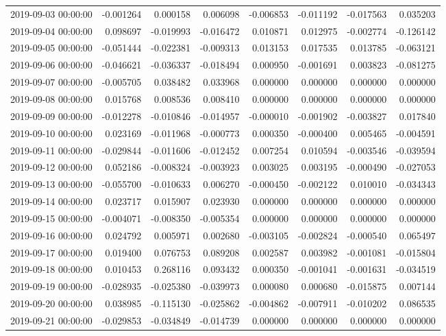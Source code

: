 \begin{tabular}{lrrrrrrr}
2019-09-03 00:00:00 & -0.001264 & 0.000158 & 0.006098 & -0.006853 & -0.011192 & -0.017563 & 0.035203 \\
2019-09-04 00:00:00 & 0.098697 & -0.019993 & -0.016472 & 0.010871 & 0.012975 & -0.002774 & -0.126142 \\
2019-09-05 00:00:00 & -0.051444 & -0.022381 & -0.009313 & 0.013153 & 0.017535 & 0.013785 & -0.063121 \\
2019-09-06 00:00:00 & -0.046621 & -0.036337 & -0.018494 & 0.000950 & -0.001691 & 0.003823 & -0.081275 \\
2019-09-07 00:00:00 & -0.005705 & 0.038482 & 0.033968 & 0.000000 & 0.000000 & 0.000000 & 0.000000 \\
2019-09-08 00:00:00 & 0.015768 & 0.008536 & 0.008410 & 0.000000 & 0.000000 & 0.000000 & 0.000000 \\
2019-09-09 00:00:00 & -0.012278 & -0.010846 & -0.014957 & -0.000010 & -0.001902 & -0.003827 & 0.017840 \\
2019-09-10 00:00:00 & 0.023169 & -0.011968 & -0.000773 & 0.000350 & -0.000400 & 0.005465 & -0.004591 \\
2019-09-11 00:00:00 & -0.029844 & -0.011606 & -0.012452 & 0.007254 & 0.010594 & -0.003546 & -0.039594 \\
2019-09-12 00:00:00 & 0.052186 & -0.008324 & -0.003923 & 0.003025 & 0.003195 & -0.000490 & -0.027053 \\
2019-09-13 00:00:00 & -0.055700 & -0.010633 & 0.006270 & -0.000450 & -0.002122 & 0.010010 & -0.034343 \\
2019-09-14 00:00:00 & 0.023717 & 0.015907 & 0.023930 & 0.000000 & 0.000000 & 0.000000 & 0.000000 \\
2019-09-15 00:00:00 & -0.004071 & -0.008350 & -0.005354 & 0.000000 & 0.000000 & 0.000000 & 0.000000 \\
2019-09-16 00:00:00 & 0.024792 & 0.005971 & 0.002680 & -0.003105 & -0.002824 & -0.000540 & 0.065497 \\
2019-09-17 00:00:00 & 0.019400 & 0.076753 & 0.089208 & 0.002587 & 0.003982 & -0.001081 & -0.015804 \\
2019-09-18 00:00:00 & 0.010453 & 0.268116 & 0.093432 & 0.000350 & -0.001041 & -0.001631 & -0.034519 \\
2019-09-19 00:00:00 & -0.028935 & -0.025380 & -0.039973 & 0.000080 & 0.000680 & -0.015875 & 0.007144 \\
2019-09-20 00:00:00 & 0.038985 & -0.115130 & -0.025862 & -0.004862 & -0.007911 & -0.010202 & 0.086535 \\
2019-09-21 00:00:00 & -0.029853 & -0.034849 & -0.014739 & 0.000000 & 0.000000 & 0.000000 & 0.000000 \\

\end{tabular}
